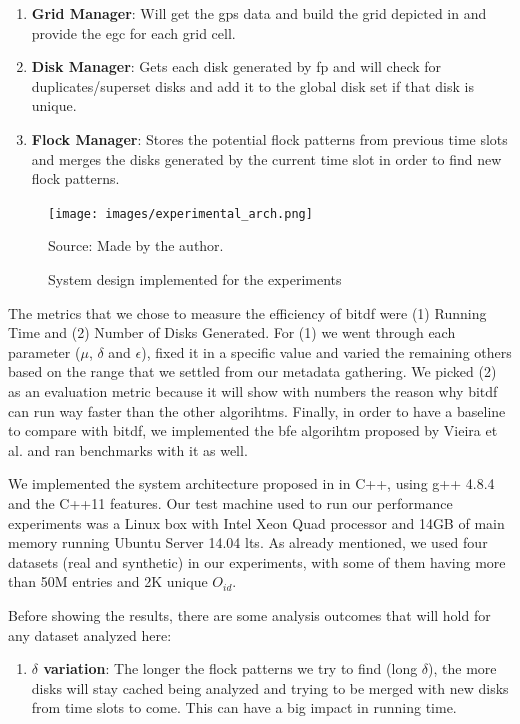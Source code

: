 {\begin{enumerate}
    \item \textbf{Grid Manager}: Will get the \ac{gps} data and build the grid depicted in  and provide
        the \ac{egc} for each grid cell.
    \item \textbf{Disk Manager}: Gets each disk generated by \ac{fp} and will check for duplicates/superset disks and
        add it to the global disk set if that disk is unique.
    \item \textbf{Flock Manager}: Stores the potential flock patterns from previous time slots and merges the disks
        generated by the current time slot in order to find new flock patterns.
\end{enumerate}

\begin{figure}[h!]
    \centering
    \caption{System design implemented for the experiments}
    \centerline{\texttt{[image: images/experimental\_arch.png]}}
    \footnotesize{Source: Made by the author.}
    \label{fig:experimental_arch}
\end{figure}

The metrics that we chose to measure the efficiency of \ac{bitdf} were (1) Running Time and (2) Number of Disks
Generated.  For (1) we went through each parameter ($\mu$, $\delta$ and $\epsilon$), fixed it in a specific value and
varied the remaining others based on the range that we settled from our metadata gathering. We picked (2) as an
evaluation metric because it will show with numbers the reason why \ac{bitdf} can run way faster than the other
algorihtms. Finally, in order to have a baseline to compare with \ac{bitdf}, we implemented the \ac{bfe} algorihtm
proposed by Vieira et al. \citep{vieira} and ran benchmarks with it as well.

We implemented the system architecture proposed in  in C++, using g++ 4.8.4 and the C++11
\citep{cpp11spec} features. Our test machine used to run our performance experiments was a Linux box with Intel Xeon
Quad processor and 14GB of main memory running Ubuntu Server 14.04 \ac{lts}. As already mentioned, we used four datasets
(real and synthetic) in our experiments, with some of them having more than 50M entries and 2K unique $O_{id}$.

Before showing the results, there are some analysis outcomes that will hold for any dataset analyzed here:

\begin{enumerate}
    \item \textbf{$\delta$ variation}: The longer the flock patterns we try to find (long $\delta$), the more disks will
        stay cached being analyzed and trying to be merged with new disks from time slots to come. This can have a big
        impact in running time.\label{sssec:lvariation}


\end{enumerate}}
